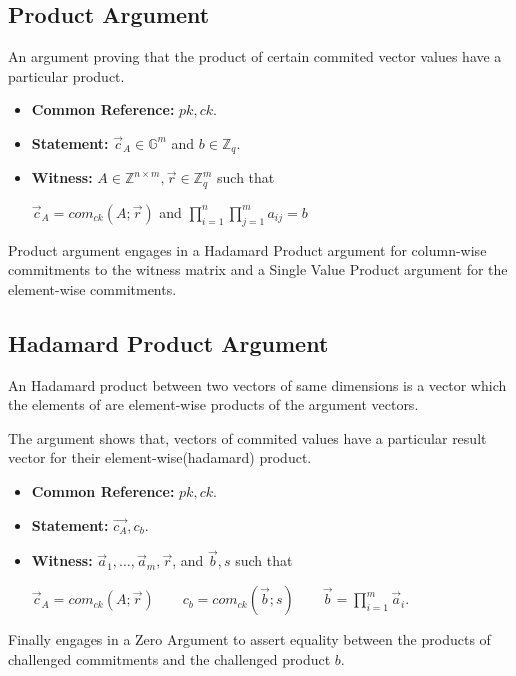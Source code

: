 \documentclass[12pt,a4paper]{report}
\begin{document}
\subsection*{Product Argument} An argument proving that the product of certain commited vector values have a particular product.
\begin{itemize}
	\item \textbf{Common Reference:} $pk, ck$.
	\item \textbf{Statement:} $\vec{c}_A \in \mathbb{G}^m$ and $b \in \mathbb{Z}_q$.
	\item \textbf{Witness:} $A \in \mathbb{Z}^{n \times m}, \vec{r} \in \mathbb{Z}_{q}^m$ such that
		\begin{center}
			$\vec{c}_A = com_{ck}(A; \vec{r})$ and $\displaystyle \prod_{i=1}^n \prod_{j=1}^m a_{ij} = b$
		\end{center}
\end{itemize}
Product argument engages in a Hadamard Product argument for column-wise commitments to the witness matrix and a Single Value Product argument for the element-wise commitments.
\subsection*{Hadamard Product Argument} An Hadamard product between two vectors of same dimensions is a vector which the elements of are element-wise products of the argument vectors.\par
The argument shows that, vectors of commited values have a particular result vector for their element-wise(hadamard) product.
\begin{itemize}
	\item \textbf{Common Reference:} $pk, ck$.
	\item \textbf{Statement:} $\vec{c_A}, c_b$.
	\item \textbf{Witness:} $\vec{a}_1,\ldots,\vec{a}_m,\vec{r}$, and $\vec{b}, s$ such that
		\begin{center}
			$\displaystyle \vec{c}_A = com_{ck}(A;\vec{r})\qquad c_b = com_{ck}(\vec{b}; s)\qquad \vec{b} = \prod_{i=1}^m \vec{a}_i$.
		\end{center}

\end{itemize}
Finally engages in a Zero Argument to assert equality between the products of challenged commitments and the challenged product $b$.
\end{document}
